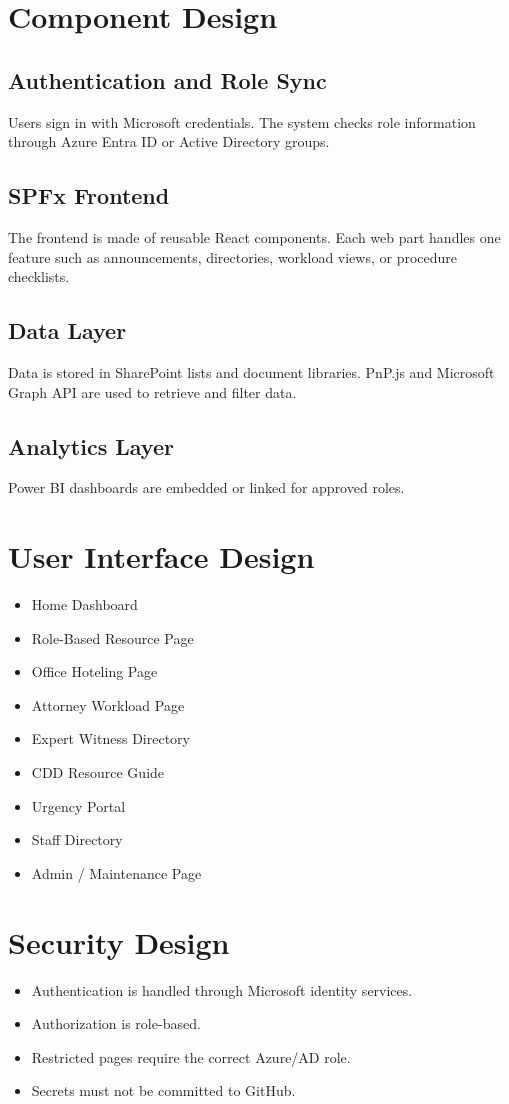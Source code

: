 \documentclass[12pt]{article}
\begin{document}
\section{Component Design}
\subsection{Authentication and Role Sync}
Users sign in with Microsoft credentials. The system checks role information through Azure Entra ID or Active Directory groups.

\subsection{SPFx Frontend}
The frontend is made of reusable React components. Each web part handles one feature such as announcements, directories, workload views, or procedure checklists.

\subsection{Data Layer}
Data is stored in SharePoint lists and document libraries. PnP.js and Microsoft Graph API are used to retrieve and filter data.

\subsection{Analytics Layer}
Power BI dashboards are embedded or linked for approved roles.

\section{User Interface Design}
\begin{itemize}
\item Home Dashboard
\item Role-Based Resource Page
\item Office Hoteling Page
\item Attorney Workload Page
\item Expert Witness Directory
\item CDD Resource Guide
\item Urgency Portal
\item Staff Directory
\item Admin / Maintenance Page
\end{itemize}

\section{Security Design}
\begin{itemize}
\item Authentication is handled through Microsoft identity services.
\item Authorization is role-based.
\item Restricted pages require the correct Azure/AD role.
\item Secrets must not be committed to GitHub.
\end{itemize}
\end{document}
